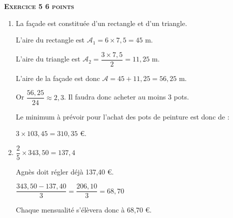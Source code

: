 \textbf{\textsc{Exercice 5 \hfill 6 points}}

\medskip

\begin{enumerate}
\item La façade est constituée d'un rectangle et d'un triangle.

L'aire du rectangle est $\mathscr{A}_1 = 6 \times 7,5 = 45$ m.

L'aire du triangle est $\mathscr{A}_2 = \dfrac{3 \times 7,5}{2} = 11,25$ m.

L'aire de la façade est donc $\mathscr{A} = 45 + 11,25 = 56,25$ m.

Or $\dfrac{56,25}{24} \approx 2,3$. Il faudra donc acheter au moins 3 pots.

Le minimum à prévoir pour l'achat des pots de peinture est donc de :

$3 \times 103,45 = 310,35$ \euro.
\item $\dfrac{2}{5} \times 343,50 = 137,4$

Agnès doit régler déjà 137,40 \euro.

$\dfrac{343,50 - 137,40}{3} = \dfrac{206,10}{3} = 68,70$

Chaque mensualité s'élèvera donc à 68,70 \euro.
\end{enumerate}

\medskip


